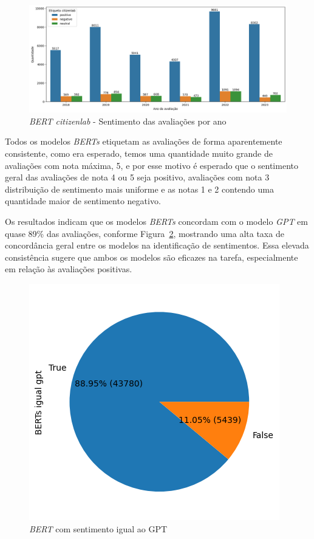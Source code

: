 \begin{figure}
	\centering
	\includegraphics[width=1\textwidth]{figs/bert/classificacao_citizenlab.png}
	\caption{\textit{BERT citizenlab} - Sentimento das avaliações por ano}
	\label{img:sentimento_citizenlab}
\end{figure}


Todos os modelos \textit{BERTs} etiquetam as avaliações de forma aparentemente consistente, como era esperado, temos uma quantidade muito grande de avaliações com nota máxima, 5, e por esse motivo é esperado que o sentimento geral das avaliações de nota 4 ou 5 seja positivo, avaliações com nota 3 distribuição de sentimento mais uniforme e as notas 1 e 2 contendo uma quantidade maior de sentimento negativo.

Os resultados indicam que os modelos \textit{BERTs} concordam com o modelo \textit{GPT} em quase 89\% das avaliações, conforme Figura~\ref{img:bert_vs_gpt}, mostrando uma alta taxa de concordância geral entre os modelos na identificação de sentimentos. Essa elevada consistência sugere que ambos os modelos são eficazes na tarefa, especialmente em relação às avaliações positivas.

\begin{figure}
	\centering
	\includegraphics{figs/bert/vs_gpt.png}
	\caption{\textit{BERT} com sentimento igual ao GPT}
	\label{img:bert_vs_gpt}
\end{figure}

